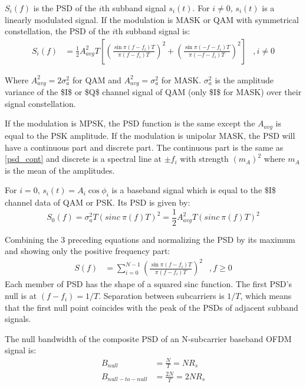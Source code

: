 $S_i(f)$ is the \gls{PSD} of the $i$th \gls{subband} signal $s_i(t)$. For $i\neq 0$, $s_i(t)$ is a linearly modulated signal. If the modulation is \gls{MASK} or \gls{QAM} with symmetrical constellation, the \gls{PSD} of the $i$th \gls{subband} signal is:
\begin{align}
\label{psd_cont}
S_i(f) &= \frac{1}{2}A_{avg}^2T\left[ \left(\frac{\sin \pi (f-f_i)T}{\pi (f-f_i)T}\right)^2 + \left(\frac{\sin \pi (-f-f_i)T}{\pi (-f-f_i)T}\right)^2\right]&, i\neq 0
\end{align}

Where $A_{avg}^2 = 2\sigma_a^2$ for \gls{QAM} and $A_{avg}^2 = \sigma_a^2$ for \gls{MASK}. $\sigma_a^2$ is the amplitude variance of the \gls{$I$} or \gls{$Q$} channel signal of \gls{QAM} (only \gls{$I$} for MASK) over their signal constellation.

If the modulation is \gls{MPSK}, the \gls{PSD} function is the same except the $A_{avg}$ is equal to the \gls{PSK} amplitude. If the modulation is unipolar \gls{MASK}, the \gls{PSD} will have a continuous part and discrete part. The continuous part is the same as \eqref{psd_cont} and discrete is a spectral line at $\pm f_i$ with strength $\left( m_A\right)^2$ where $m_A$ is the mean of the amplitudes.

For $i=0$, $s_i(t) = A_i\cos\phi_i$ is a baseband signal which is equal to the \gls{$I$} channel data of \gls{QAM} or \gls{PSK}. Its \gls{PSD} is given by:
$$S_0(f) = \sigma_a^2T\left( sinc\ \pi (f)T\right)^2 = \frac{1}{2}A_{avg}^2T\left( sinc\ \pi (f)T\right)^2$$

Combining the 3 preceding equations and normalizing the \gls{PSD} by its maximum and showing only the positive frequency part:
\begin{align}
	\label{psd_gen}
	S(f) &= \sum_{i=0}^{N-1}\left( \frac{\sin\pi(f-f_i)T}{\pi(f-f_i)T}\right)^2 &, f\geq 0
\end{align}
Each member of \gls{PSD} has the shape of a squared sinc function. The first \gls{PSD}'s null is at $(f-f_i)=1/T$. Separation between \gls{subcarrier}s is $1/T$, which means that the first null point coincides with the peak of the \gls{PSD}s of adjacent \gls{subband} signals.

The null bandwidth of the composite \gls{PSD} of an N-subcarrier baseband \gls{OFDM} signal is:
\begin{align*}
B_{null} &= \frac{N}{T} = NR_s\\
B_{null-to-null}&=\frac{2N}{T} = 2NR_s
\end{align*}


